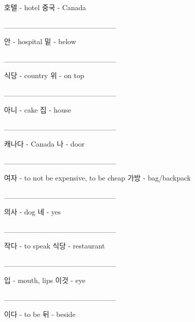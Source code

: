 \documentclass[addpoints, 30pt]{../exam}%
\begin{document}
\begin{questions}
\begin{choices}
\CorrectChoice%
호텔 {-} hotel%
\choice%
중국 {-} Canada%
\end{choices}%
\question[1]%
\_\_\_\_\_\_\_\_\_\_\_\_\_\_\_\_\_\_\_\_\_%
\begin{choices}%
\choice%
안 {-} hospital%
\CorrectChoice%
밑 {-} below%
\end{choices}%
\question[1]%
\_\_\_\_\_\_\_\_\_\_\_\_\_\_\_\_\_\_\_\_\_%
\begin{choices}%
\choice%
식당 {-} country%
\CorrectChoice%
위 {-} on top%
\end{choices}%
\question[1]%
\_\_\_\_\_\_\_\_\_\_\_\_\_\_\_\_\_\_\_\_\_%
\begin{choices}%
\choice%
아니 {-} cake%
\CorrectChoice%
집 {-} house%
\end{choices}%
\question[1]%
\_\_\_\_\_\_\_\_\_\_\_\_\_\_\_\_\_\_\_\_\_%
\begin{choices}%
\CorrectChoice%
캐나다 {-} Canada%
\choice%
나 {-} door%
\end{choices}%
\question[1]%
\_\_\_\_\_\_\_\_\_\_\_\_\_\_\_\_\_\_\_\_\_%
\begin{choices}%
\choice%
여자 {-} to not be expensive, to be cheap%
\CorrectChoice%
가방 {-} bag/backpack%
\end{choices}%
\question[1]%
\_\_\_\_\_\_\_\_\_\_\_\_\_\_\_\_\_\_\_\_\_%
\begin{choices}%
\choice%
의사 {-} dog%
\CorrectChoice%
네 {-} yes%
\end{choices}%
\question[1]%
\_\_\_\_\_\_\_\_\_\_\_\_\_\_\_\_\_\_\_\_\_%
\begin{choices}%
\choice%
작다 {-} to speak%
\CorrectChoice%
식당 {-} restaurant%
\end{choices}%
\question[1]%
\_\_\_\_\_\_\_\_\_\_\_\_\_\_\_\_\_\_\_\_\_%
\begin{choices}%
\CorrectChoice%
입 {-} mouth, lips%
\choice%
이것 {-} eye%
\end{choices}%
\question[1]%
\_\_\_\_\_\_\_\_\_\_\_\_\_\_\_\_\_\_\_\_\_%
\begin{choices}%
\CorrectChoice%
이다 {-} to be%
\choice%
뒤 {-} beside%
\end{choices}%
\end{questions}%
\end{document}
